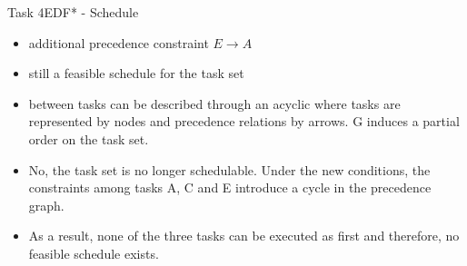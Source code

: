 \begin{frame}[allowframebreaks]{Task 4}{EDF* - Schedule}
  \begin{tasknoinc}
    \begin{itemize}
      \item additional precedence constraint $E \rightarrow A$
      \item still a \alert{feasible schedule} for the task set
    \end{itemize}
  \end{tasknoinc}
  \begin{requirementsnoinc}
    \begin{itemize}
      \item {} between tasks can be described through an \alert{acyclic}  where tasks are represented by nodes and precedence relations by arrows. G induces a partial order on the task set.
    \end{itemize}
  \end{requirementsnoinc}
  \begin{solutionnoinc}
    \begin{itemize}
      \item No, the task set is no longer schedulable. Under the new conditions, the constraints among tasks A, C
and E introduce a cycle in the precedence graph.
      \item As a result, none of the three tasks can be executed as first and therefore, no feasible schedule exists.
    \end{itemize}
  \end{solutionnoinc}
\end{frame}

